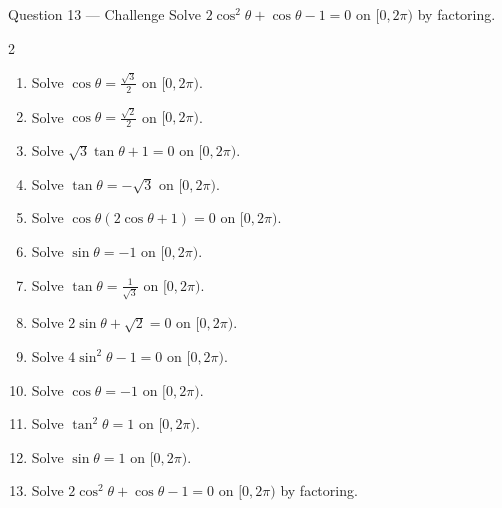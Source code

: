 \documentclass[11pt]{article}
\begin{document}
\begin{qbox}{Question 13 --- Challenge}
Solve $2\cos^2\theta+\cos\theta-1=0$ on $[0,2\pi)$ by factoring.\workspace{3.5cm}
\end{qbox}

\clearpage
{}

\begin{recapbox}
\begin{multicols}{2}
\small
\begin{enumerate}[leftmargin=*,itemsep=3pt]
  \item Solve $\cos\theta=\tfrac{\sqrt3}{2}$ on $[0,2\pi)$.
  \item Solve $\cos\theta=\tfrac{\sqrt2}{2}$ on $[0,2\pi)$.
  \item Solve $\sqrt3\tan\theta+1=0$ on $[0,2\pi)$.
  \item Solve $\tan\theta=-\sqrt3$ on $[0,2\pi)$.
  \item Solve $\cos\theta(2\cos\theta+1)=0$ on $[0,2\pi)$.
  \item Solve $\sin\theta=-1$ on $[0,2\pi)$.
  \item Solve $\tan\theta=\tfrac{1}{\sqrt3}$ on $[0,2\pi)$.
  \item Solve $2\sin\theta+\sqrt2=0$ on $[0,2\pi)$.
  \item Solve $4\sin^2\theta-1=0$ on $[0,2\pi)$.
  \item Solve $\cos\theta=-1$ on $[0,2\pi)$.
  \item Solve $\tan^2\theta=1$ on $[0,2\pi)$.
  \item Solve $\sin\theta=1$ on $[0,2\pi)$.
  \item Solve $2\cos^2\theta+\cos\theta-1=0$ on $[0,2\pi)$ by factoring.
\end{enumerate}
\end{multicols}
\end{recapbox}
\end{document}
